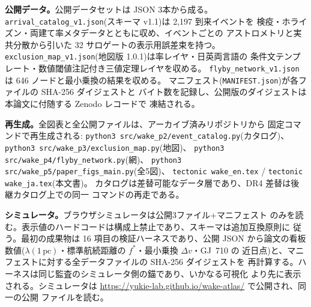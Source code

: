 \documentclass[11pt]{article}
\newcommand{\pc}{\,\mathrm{pc}}
\newcommand{\lam}{\lambda}
\begin{document}
\textbf{公開データ。}公開データセットは JSON 3本から成る。
\texttt{arrival\_catalog\_v1.json}(スキーマ v1.1)は 2{,}197 到来イベントを
検疫・ホライズン・両建て率メタデータとともに収め、イベントごとの
アストロメトリと実共分散から引いた 32 サロゲートの表示用誤差束を持つ。
\texttt{exclusion\_map\_v1.json}(地図版 1.0.1)は率レイヤ・日英両言語の
条件文テンプレート・数値閾値注記付き三値定理レイヤを収める。
\texttt{flyby\_network\_v1.json} は 646 ノードと最小乗換の結果を収める。
マニフェスト(\texttt{MANIFEST.json})が各ファイルの SHA-256 ダイジェストと
バイト数を記録し、公開版のダイジェストは本論文に付随する Zenodo レコードで
凍結される。

\textbf{再生成。}全図表と全公開ファイルは、アーカイブ済みリポジトリから
固定コマンドで再生成される:
\texttt{python3 src/wake\_p2/event\_catalog.py}(カタログ)、
\texttt{python3 src/wake\_p3/exclusion\_map.py}(地図)、
\texttt{python3 src/wake\_p4/flyby\_network.py}(網)、
\texttt{python3 src/wake\_p5/paper\_figs\_main.py}(全5図)、
\texttt{tectonic wake\_en.tex} / \texttt{tectonic wake\_ja.tex}(本文書)。
カタログは差替可能なデータ層であり、DR4 差替は後継カタログ上での同一
コマンドの再走である。

\textbf{シミュレータ。}ブラウザシミュレータは公開3ファイル+マニフェスト
のみを読む。表示値のハードコードは構成上禁止であり、スキーマは追加互換原則に
従う。最初の成果物は 16 項目の検証ハーネスであり、公開 JSON から論文の看板
数値($\lam(1\pc)$・標準航続距離の $f^*$・最小乗換 $\Delta v$・GJ~710 の
近日点)と、マニフェストに対する全データファイルの SHA-256 ダイジェストを
再計算する。ハーネスは同じ監査のシミュレータ側の錨であり、いかなる可視化
より先に表示される。シミュレータは
\url{https://yukie-lab.github.io/wake-atlas/} で公開され、同一の公開
ファイルを読む。



\end{document}
